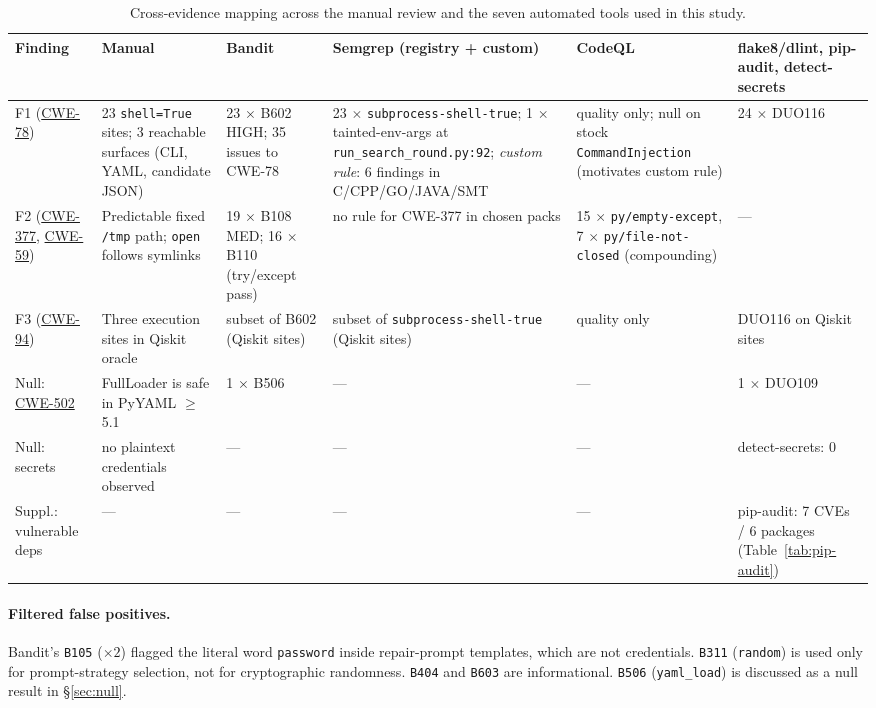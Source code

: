 \documentclass[conference]{IEEEtran}
\newcommand{\cwe}[1]{\href{https://cwe.mitre.org/data/definitions/#1.html}{CWE-#1}}
\begin{document}
\begin{table}[t]
\caption{Cross-evidence mapping across the manual review and the seven
automated tools used in this study.}
\label{tab:cross}
\centering\renewcommand{\arraystretch}{1.2}
\begin{tabularx}{\textwidth}{lXXXXX}
\toprule
\textbf{Finding} & \textbf{Manual} & \textbf{Bandit} & \textbf{Semgrep (registry + custom)} & \textbf{CodeQL} & \textbf{flake8/dlint, pip-audit, detect-secrets} \\
\midrule
F1 (\cwe{78}) & 23 \texttt{shell=True} sites; 3 reachable surfaces (CLI, YAML, candidate JSON) & 23 $\times$ B602 HIGH; 35 issues to CWE-78 & 23 $\times$ \texttt{subprocess-shell-true}; 1 $\times$ tainted-env-args at \texttt{run\_search\_round.py:92}; \emph{custom rule}: 6 findings in C/CPP/GO/JAVA/SMT & quality only; null on stock \texttt{CommandInjection} (motivates custom rule) & 24 $\times$ DUO116 \\
F2 (\cwe{377}, \cwe{59}) & Predictable fixed \texttt{/tmp} path; \texttt{open} follows symlinks & 19 $\times$ B108 MED; 16 $\times$ B110 (try/except pass) & no rule for CWE-377 in chosen packs & 15 $\times$ \texttt{py/empty-except}, 7 $\times$ \texttt{py/file-not-closed} (compounding) & --- \\
F3 (\cwe{94}) & Three execution sites in Qiskit oracle & subset of B602 (Qiskit sites) & subset of \texttt{subprocess-shell-true} (Qiskit sites) & quality only & DUO116 on Qiskit sites \\
Null: \cwe{502} & FullLoader is safe in PyYAML $\geq$ 5.1 & 1 $\times$ B506 & --- & --- & 1 $\times$ DUO109 \\
Null: secrets & no plaintext credentials observed & --- & --- & --- & detect-secrets: 0 \\
Suppl.: vulnerable deps & --- & --- & --- & --- & pip-audit: 7 CVEs / 6 packages (Table~\ref{tab:pip-audit}) \\
\bottomrule
\end{tabularx}
\end{table}

\paragraph{Filtered false positives.}
Bandit's \texttt{B105} ($\times 2$) flagged the literal word \texttt{password}
inside repair-prompt templates, which are not credentials.
\texttt{B311} (\texttt{random}) is used only for prompt-strategy
selection, not for cryptographic randomness. \texttt{B404} and
\texttt{B603} are informational. \texttt{B506} (\texttt{yaml\_load}) is
discussed as a null result in \S\ref{sec:null}.
\end{document}
